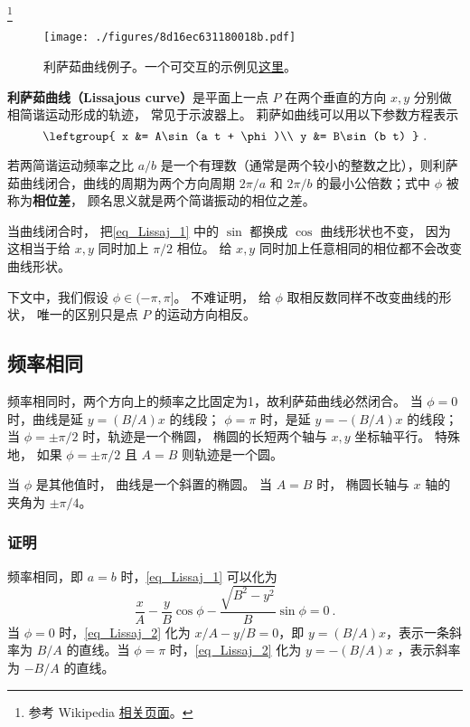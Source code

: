 

\footnote{参考 Wikipedia \href{https://en.wikipedia.org/wiki/Lissajous_curve}{相关页面}。}

\begin{figure}[ht]
\centering
\texttt{[image: ./figures/8d16ec631180018b.pdf]}
\caption{利萨茹曲线例子。一个可交互的示例见\href{https://www.geogebra.org/m/ubcdrmjb}{这里}。} \label{fig_Lissaj_3}
\end{figure}

\textbf{利萨茹曲线（Lissajous curve）}是平面上一点 $P$ 在两个垂直的方向 $x, y$ 分别做相简谐运动形成的轨迹， 常见于示波器上。 莉萨如曲线可以用以下参数方程表示
\begin{equation}\label{eq_Lissaj_1}
\leftgroup{
x &= A\sin(a t + \phi)\\
y &= B\sin(b t)
}~.\end{equation}

若两简谐运动频率之比 $a/b$ 是一个有理数（通常是两个较小的整数之比），则利萨茹曲线闭合，曲线的周期为两个方向周期 $2\pi/a$ 和 $2\pi/b$ 的最小公倍数；式中 $\phi$ 被称为\textbf{相位差}， 顾名思义就是两个简谐振动的相位之差。

当曲线闭合时， 把\autoref{eq_Lissaj_1} 中的 $\sin$ 都换成 $\cos$ 曲线形状也不变， 因为这相当于给 $x, y$ 同时加上 $\pi/2$ 相位。 给 $x, y$ 同时加上任意相同的相位都不会改变曲线形状。

下文中，我们假设 $\phi \in (-\pi, \pi]$。 不难证明， 给 $\phi$ 取相反数同样不改变曲线的形状， 唯一的区别只是点 $P$ 的运动方向相反。

\subsection{频率相同}
频率相同时，两个方向上的频率之比固定为1，故利萨茹曲线必然闭合。
当 $\phi = 0$ 时，曲线是延 $y=(B/A)x$ 的线段； $\phi = \pi$ 时，是延 $y=-(B/A)x$ 的线段； 当 $\phi = \pm\pi/2$ 时，轨迹是一个椭圆， 椭圆的长短两个轴与 $x,y$ 坐标轴平行。 特殊地， 如果 $\phi = \pm\pi/2$ 且 $A = B$ 则轨迹是一个圆。

当 $\phi$ 是其他值时， 曲线是一个斜置的椭圆。 当 $A = B$ 时， 椭圆长轴与 $x$ 轴的夹角为 $\pm\pi/4$。
\subsubsection{证明}
频率相同，即 $a=b$ 时，\autoref{eq_Lissaj_1} 可以化为
\begin{equation}\label{eq_Lissaj_2}
\frac xA-\frac yB\cos\phi-\frac{\sqrt{B^2-y^2}}{B}\sin\phi=0~.
\end{equation}
当 $\phi=0$ 时，\autoref{eq_Lissaj_2} 化为 $x/A-y/B=0$，即 $y=(B/A)x$，表示一条斜率为 $B/A$ 的直线。当 $\phi=\pi$ 时，\autoref{eq_Lissaj_2} 化为 $y=-(B/A)x$ ，表示斜率为 $-B/A$ 的直线。

